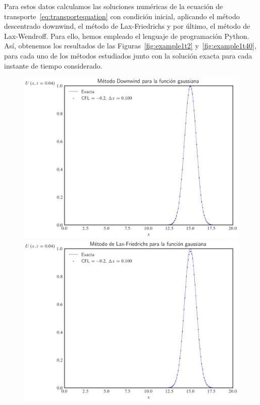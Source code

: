 Para estos datos calculamos las soluciones numéricas de la ecuación
de transporte~\eqref{eq:transportequation} con condición inicial,
aplicando el método descentrado downwind, el método de Lax-Friedrichs
y por último, el método de Lax-Wendroff.
Para ello, hemos empleado el lenguaje de programación Python.
Así, obtenemos los resultados de las Figuras~\ref{fig:example1t2}
y~\ref{fig:example1t40}, para cada uno de los métodos estudiados
junto con la solución exacta para cada instante de tiempo
considerado.

\begin{figure}[ht!]
	\centering
	\includegraphics[width=.30\paperwidth]{../snapshots/downwindgaussian1d-2.png}
	\includegraphics[width=.30\paperwidth]{../snapshots/lax-friedrichsgaussiana1d-2.png}

\end{figure}
